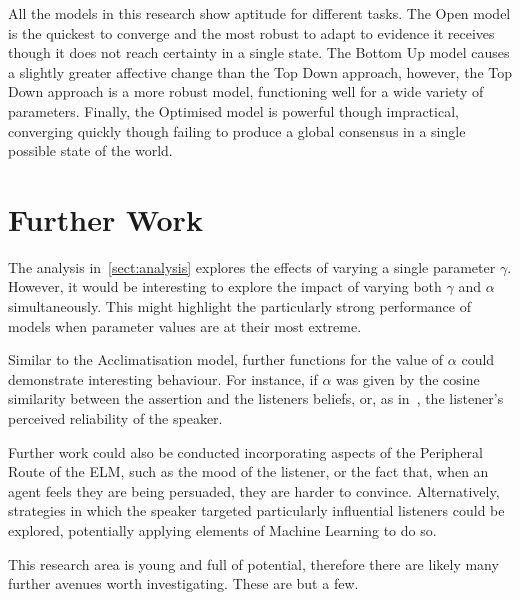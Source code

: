 All the models in this research show aptitude for different tasks. The Open model is the quickest to converge and the most robust to adapt to evidence it receives though it does not reach certainty in a single state. The Bottom Up model causes a slightly greater affective change than the Top Down approach, however, the Top Down approach is a more robust model, functioning well for a wide variety of parameters. Finally, the Optimised model is powerful though impractical, converging quickly though failing to produce a global consensus in a single possible state of the world. 


\section{Further Work}

The analysis in~\cref{sect:analysis} explores the effects of varying a single parameter $\gamma$. However, it would be interesting to explore the impact of varying both $\gamma$ and $\alpha$ simultaneously. This might highlight the particularly strong performance of models when parameter values are at their most extreme.

Similar to the Acclimatisation model, further functions for the value of $\alpha$ could demonstrate interesting behaviour. For instance, if $\alpha$ was given by the cosine similarity between the assertion and the listeners beliefs, or, as in~\cite{Hegselmann2002OpinionSimulation}, the listener's perceived reliability of the speaker. 

Further work could also be conducted incorporating aspects of the Peripheral Route of the ELM, such as the mood of the listener, or the fact that, when an agent feels they are being persuaded, they are harder to convince. Alternatively, strategies in which the speaker targeted particularly influential listeners could be explored, potentially applying elements of Machine Learning to do so.

This research area is young and full of potential, therefore there are likely many further avenues worth investigating. These are but a few. 


